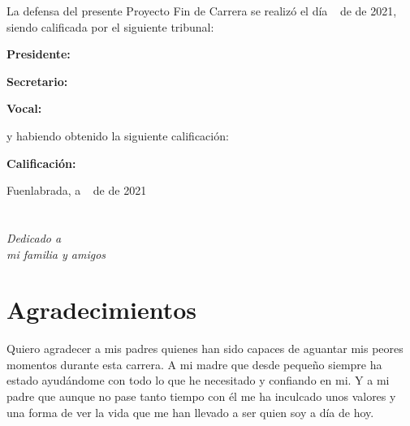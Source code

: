 \documentclass[a4paper, 12pt]{book}
\begin{document}
\vspace{1cm}
La defensa del presente Proyecto Fin de Carrera se realizó el día \qquad$\;\,$ de \qquad\qquad\qquad\qquad \newline de 2021, siendo calificada por el siguiente tribunal:


\vspace{0.5cm}
\textbf{Presidente:}

\vspace{1.2cm}
\textbf{Secretario:}

\vspace{1.2cm}
\textbf{Vocal:}


\vspace{1.2cm}
y habiendo obtenido la siguiente calificación:

\vspace{1cm}
\textbf{Calificación:}


\vspace{1cm}
\begin{flushright}
Fuenlabrada, a \qquad$\;\,$ de \qquad\qquad\qquad\qquad de 2021
\end{flushright}


\chapter*{}
\begin{flushright}
\textit{Dedicado a \\
mi familia y amigos}
\end{flushright}


\chapter*{Agradecimientos}

Quiero agradecer a mis padres quienes han sido capaces de aguantar mis peores momentos durante esta carrera. A mi madre que desde pequeño siempre ha estado ayudándome con todo lo que he necesitado y confiando en mi. Y a mi padre que aunque no pase tanto tiempo con él me ha inculcado unos valores y una forma de ver la vida que me han llevado a ser quien soy a día de hoy.
\end{document}
